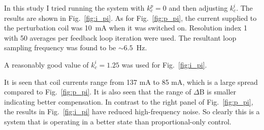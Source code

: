 

In this study I tried running the system with $k_c^p=0$ and then
adjusting $k_c^i$.  The results are shown in Fig.~\ref{fig:i_pi}.  As
for Fig.~\ref{fig:p_pi}, the current supplied to the perturbation coil
was 10~mA when it was switched on.  Resolution index 1 with 50
averages per feedback loop iteration were used.  The resultant loop
sampling frequency was found to be $\sim 6.5$~Hz.

A reasonably good value of $k_c^i=1.25$ was used for
Fig.~\ref{fig:i_pi}.

It is seen that coil currents range from 137 mA to 85 mA, which is a
large spread compared to Fig.~\ref{fig:p_pi}. It is also seen that the
range of $\Delta$B is smaller indicating better compensation.  In
contrast to the right panel of Fig.~\ref{fig:p_pi}, the results in
Fig.~\ref{fig:i_pi} have reduced high-frequency noise.  So clearly
this is a system that is operating in a better state than
proportional-only control.

